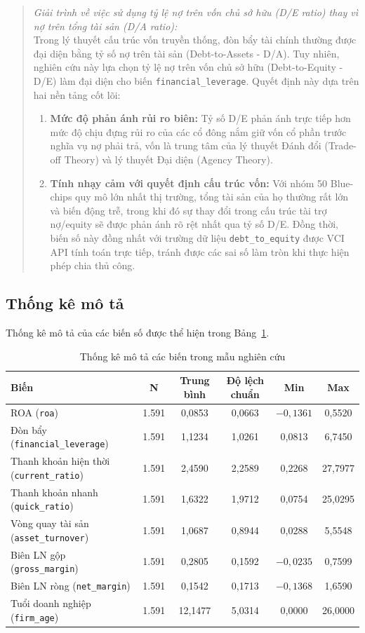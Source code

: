 \documentclass[12pt,a4paper]{article}
\begin{document}
\begin{quote}
\textit{Giải trình về việc sử dụng tỷ lệ nợ trên vốn chủ sở hữu (D/E ratio) thay vì nợ trên tổng tài sản (D/A ratio):} \\
Trong lý thuyết cấu trúc vốn truyền thống, đòn bẩy tài chính thường được đại diện bằng tỷ số nợ trên tài sản (Debt-to-Assets - D/A). Tuy nhiên, nghiên cứu này lựa chọn tỷ lệ nợ trên vốn chủ sở hữu (Debt-to-Equity - D/E) làm đại diện cho biến \texttt{financial\_leverage}. Quyết định này dựa trên hai nền tảng cốt lõi:
\begin{enumerate}
    \item \textbf{Mức độ phản ánh rủi ro biên:} Tỷ số D/E phản ánh trực tiếp hơn mức độ chịu đựng rủi ro của các cổ đông nắm giữ vốn cổ phần trước nghĩa vụ nợ phải trả, vốn là trung tâm của lý thuyết Đánh đổi (Trade-off Theory) và lý thuyết Đại diện (Agency Theory).
    \item \textbf{Tính nhạy cảm với quyết định cấu trúc vốn:} Với nhóm 50 Blue-chips quy mô lớn nhất thị trường, tổng tài sản của họ thường rất lớn và biến động trễ, trong khi đó sự thay đổi trong cấu trúc tài trợ nợ/equity sẽ được phản ánh rõ rệt nhất qua tỷ số D/E. Đồng thời, biến số này đồng nhất với trường dữ liệu \texttt{debt\_to\_equity} được VCI API tính toán trực tiếp, tránh được các sai số làm tròn khi thực hiện phép chia thủ công.
\end{enumerate}
\end{quote}

\subsection{Thống kê mô tả}
Thống kê mô tả của các biến số được thể hiện trong Bảng~\ref{tab:descriptive}.

\begin{table}[htbp]
\centering
\caption{Thống kê mô tả các biến trong mẫu nghiên cứu}
\label{tab:descriptive}
\begin{tabular}{lccccc}
\toprule
\textbf{Biến} & \textbf{N} & \textbf{Trung bình} & \textbf{Độ lệch chuẩn} & \textbf{Min} & \textbf{Max} \\
\midrule
ROA (\texttt{roa}) & 1.591 & 0,0853 & 0,0663 & $-0,1361$ & 0,5520 \\
Đòn bẩy (\texttt{financial\_leverage}) & 1.591 & 1,1234 & 1,0261 & 0,0813 & 6,7450 \\
Thanh khoản hiện thời (\texttt{current\_ratio}) & 1.591 & 2,4590 & 2,2589 & 0,2268 & 27,7977 \\
Thanh khoản nhanh (\texttt{quick\_ratio}) & 1.591 & 1,6322 & 1,9712 & 0,0754 & 25,0295 \\
Vòng quay tài sản (\texttt{asset\_turnover}) & 1.591 & 1,0687 & 0,8944 & 0,0288 & 5,5548 \\
Biên LN gộp (\texttt{gross\_margin}) & 1.591 & 0,2805 & 0,1592 & $-0,0235$ & 0,7599 \\
Biên LN ròng (\texttt{net\_margin}) & 1.591 & 0,1542 & 0,1713 & $-0,1368$ & 1,6590 \\
Tuổi doanh nghiệp (\texttt{firm\_age}) & 1.591 & 12,1477 & 5,0314 & 0,0000 & 26,0000 \\
\bottomrule
\end{tabular}
\end{table}
\end{document}

